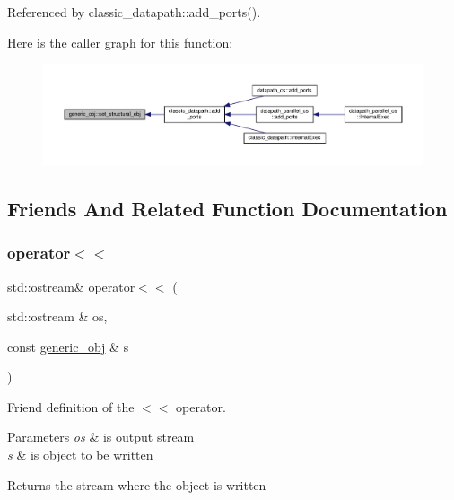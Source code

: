 Referenced by classic\+\_\+datapath\+::add\+\_\+ports().

Here is the caller graph for this function\+:
\nopagebreak
\begin{figure}[H]
\begin{center}
\leavevmode
\includegraphics[width=350pt]{d1/d64/classgeneric__obj_a89d8344e47df397e559fb8e13999d6f4_icgraph}
\end{center}
\end{figure}


\subsection{Friends And Related Function Documentation}
\mbox{\label{classgeneric__obj_a1169edfd3843813c34f61af40199a5cd}} 
\subsubsection{\texorpdfstring{operator$<$$<$}{operator<<}}
{\footnotesize\ttfamily std\+::ostream\& operator$<$$<$ (\begin{DoxyParamCaption}\item[{std\+::ostream \&}]{os,  }\item[{const \hyperlink{classgeneric__obj}{generic\+\_\+obj} \&}]{s }\end{DoxyParamCaption})\hspace{0.3cm}{\ttfamily [friend]}}



Friend definition of the $<$$<$ operator. 


\begin{DoxyParams}{Parameters}
{\em os} & is output stream \\
\hline
{\em s} & is object to be written \\
\hline
\end{DoxyParams}
\begin{DoxyReturn}{Returns}
the stream where the object is written 
\end{DoxyReturn}


